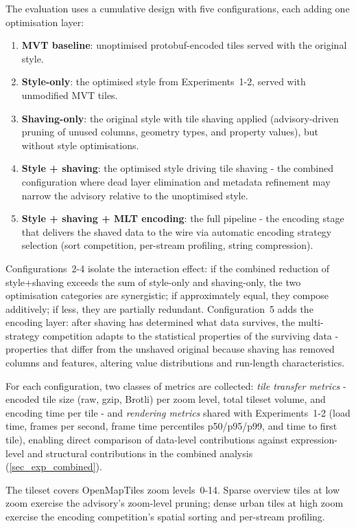 The evaluation uses a cumulative design with five configurations, each adding one optimisation layer:

\begin{enumerate}
    \item \textbf{\ac{MVT} baseline}: unoptimised protobuf-encoded tiles served with the original style.
    \item \textbf{Style-only}: the optimised style from Experiments~1-2, served with unmodified \ac{MVT} tiles.
    \item \textbf{Shaving-only}: the original style with tile shaving applied (advisory-driven pruning of unused columns, geometry types, and property values), but without style optimisations.
    \item \textbf{Style + shaving}: the optimised style driving tile shaving - the combined configuration where dead layer elimination and metadata refinement may narrow the advisory relative to the unoptimised style.
    \item \textbf{Style + shaving + MLT encoding}: the full pipeline - the encoding stage that delivers the shaved data to the wire via automatic encoding strategy selection (sort competition, per-stream profiling, string compression).
\end{enumerate}

\noindent Configurations~2-4 isolate the interaction effect: if the combined reduction of style+shaving exceeds the sum of style-only and shaving-only, the two optimisation categories are synergistic; if approximately equal, they compose additively; if less, they are partially redundant.
Configuration~5 adds the encoding layer: after shaving has determined what data survives, the multi-strategy competition adapts to the statistical properties of the surviving data - properties that differ from the unshaved original because shaving has removed columns and features, altering value distributions and run-length characteristics.

For each configuration, two classes of metrics are collected: \emph{tile transfer metrics} - encoded tile size (raw, gzip, Brotli) per zoom level, total tileset volume, and encoding time per tile - and \emph{rendering metrics} shared with Experiments~1-2 (load time, frames per second, frame time percentiles p50/p95/p99, and time to first tile), enabling direct comparison of data-level contributions against expression-level and structural contributions in the combined analysis (\cref{sec_exp_combined}).

The tileset covers OpenMapTiles zoom levels~0-14.
Sparse overview tiles at low zoom exercise the advisory's zoom-level pruning; dense urban tiles at high zoom exercise the encoding competition's spatial sorting and per-stream profiling.

